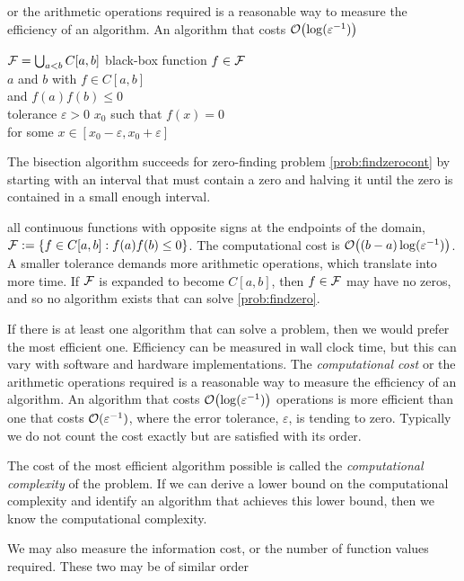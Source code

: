 or the arithmetic operations required is a reasonable way to measure the efficiency of an algorithm.  An algorithm that costs $\operatorname{{\mathcal O}}\bigl(\log(\varepsilon^{-1})\bigr)$

%
{$\mathcal{F} = \bigcup_{a < b} C[a,b]$}%
{black-box function $f \in \mathcal{F}$ \\ 
$a$ and $b$ with $f \in C[a,b]$ \\
\qquad and $f(a) f(b) \le 0$ \\
tolerance $\varepsilon > 0$ }%
{$x_0$ such that $f(x) = 0$ \\ 
    \qquad for some $x \in [x_0 - \varepsilon, x_0 + \varepsilon]$}


The bisection algorithm succeeds for zero-finding problem \eqref{prob:findzerocont} by starting with an interval that must contain a zero and halving it until the zero is contained in a small enough interval.













all continuous functions  with opposite signs at the endpoints of the domain, $\mathcal{F}: = \{ f \in C[a,b] : f(a)f(b) \le 0\}$.  The computational cost is $\operatorname{{\mathcal O}}\bigl((b-a) \log(\varepsilon^{-1}) \bigr)$. A smaller tolerance demands more arithmetic operations, which translate into more time.  If $\mathcal{F}$ is expanded to become $C[a,b]$, then $f \in \mathcal{F}$ may have no zeros, and so no algorithm exists that can solve \eqref{prob:findzero}.

If there is at least one algorithm that can solve a problem, then we would prefer the most efficient one.  Efficiency can be measured in wall clock time, but this can vary with software and hardware implementations.  The \emph{computational cost} or the arithmetic operations required is a reasonable way to measure the efficiency of an algorithm.  An algorithm that costs $\operatorname{{\mathcal O}}\bigl(\log(\varepsilon^{-1})\bigr)$ operations is more efficient than one that costs $\operatorname{{\mathcal O}}(\varepsilon^{-1})$, where the error tolerance, $\varepsilon$, is tending to zero. Typically we do not count the cost exactly but are satisfied with its order.

The cost of the most efficient algorithm possible is called the \emph{computational complexity} of the problem.  If we can derive a lower bound on the computational complexity and identify an algorithm that achieves this lower bound, then we know the computational complexity.

We may also measure the information cost, or the number of function values required.  These two may be of similar order


